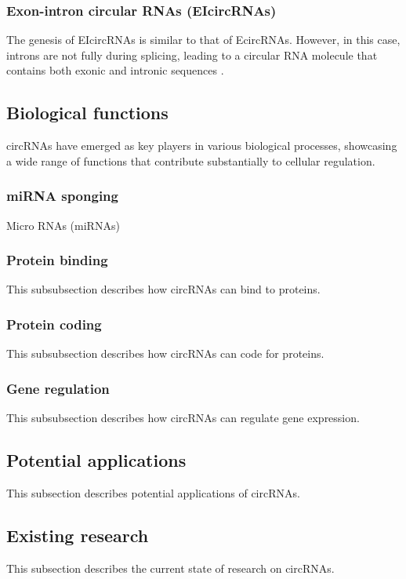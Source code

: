 \subsubsection{Exon-intron circular RNAs (EIcircRNAs)}
The genesis of EIcircRNAs is similar to that of EcircRNAs.
However, in this case, introns are not fully during splicing,
leading to a circular RNA molecule that contains both exonic and intronic sequences \supercite{xiao_circular_2022}.

\subsection{Biological functions}
circRNAs have emerged as key players in various biological processes,
showcasing a wide range of functions that contribute substantially to cellular regulation.

\subsubsection{miRNA sponging}
Micro RNAs (miRNAs)

\subsubsection{Protein binding}
This subsubsection describes how circRNAs can bind to proteins.

\subsubsection{Protein coding}
This subsubsection describes how circRNAs can code for proteins.

\subsubsection*{Gene regulation}
This subsubsection describes how circRNAs can regulate gene expression.

\subsection{Potential applications}
This subsection describes potential applications of circRNAs.

\subsection{Existing research}
This subsection describes the current state of research on circRNAs.

